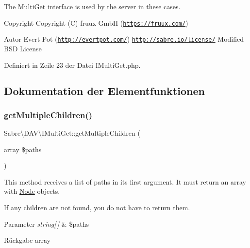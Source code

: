 The Multi\+Get interface is used by the server in these cases.

\begin{DoxyCopyright}{Copyright}
Copyright (C) fruux GmbH (\href{https://fruux.com/}{\tt https\+://fruux.\+com/}) 
\end{DoxyCopyright}
\begin{DoxyAuthor}{Autor}
Evert Pot (\href{http://evertpot.com/}{\tt http\+://evertpot.\+com/})  \href{http://sabre.io/license/}{\tt http\+://sabre.\+io/license/} Modified B\+SD License 
\end{DoxyAuthor}


Definiert in Zeile 23 der Datei I\+Multi\+Get.\+php.



\subsection{Dokumentation der Elementfunktionen}
\mbox{\label{interface_sabre_1_1_d_a_v_1_1_i_multi_get_a4d66db5c26d9247511687cd277799528}} 
\subsubsection{\texorpdfstring{get\+Multiple\+Children()}{getMultipleChildren()}}
{\footnotesize\ttfamily Sabre\textbackslash{}\+D\+A\+V\textbackslash{}\+I\+Multi\+Get\+::get\+Multiple\+Children (\begin{DoxyParamCaption}\item[{array}]{\$paths }\end{DoxyParamCaption})}

This method receives a list of paths in it\textquotesingle{}s first argument. It must return an array with \mbox{\hyperlink{class_sabre_1_1_d_a_v_1_1_node}{Node}} objects.

If any children are not found, you do not have to return them.


\begin{DoxyParams}{Parameter}
{\em string\mbox{[}$\,$\mbox{]}} & \$paths \\
\hline
\end{DoxyParams}
\begin{DoxyReturn}{Rückgabe}
array 
\end{DoxyReturn}


